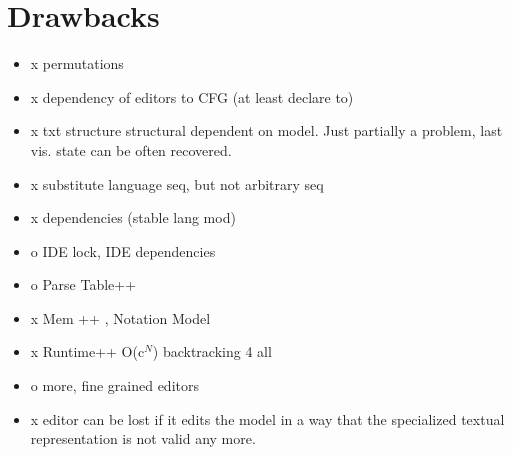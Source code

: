 \section{Drawbacks}
\begin{itemize}
	\item x permutations
	\item x dependency of editors to CFG (at least declare to)
	\item x txt structure structural dependent on model. Just partially a problem, last vis. state can be often recovered.
	\item x substitute language seq, but not arbitrary seq
	\item x dependencies (stable lang mod)
	\item o IDE lock, IDE dependencies
	\item o Parse Table++
	\item x Mem ++ , Notation Model
	\item x Runtime++ O(c$^N$) backtracking 4 all
	\item o more, fine grained editors
	\item x editor can be lost if it edits the model in a way that the specialized textual representation is not valid any more.
\end{itemize}